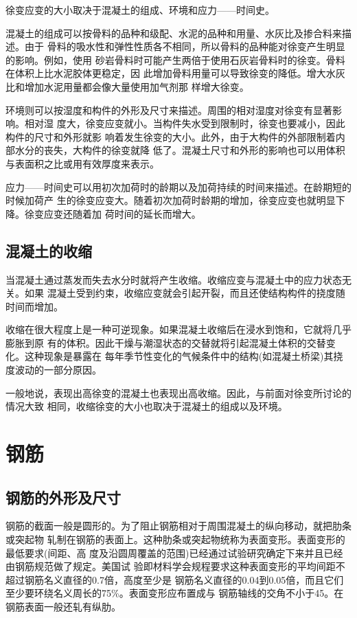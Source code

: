 \documentclass[12pt,a4paper]{book}
\begin{document}
徐变应变的大小取决于混凝土的组成、环境和应力——时间史。

混凝土的组成可以按骨料的品种和级配、水泥的品种和用量、水灰比及掺合料来描述。由于
骨料的吸水性和弹性性质各不相同，所以骨料的品种能对徐变产生明显的影响。例如，使用
砂岩骨料时可能产生两倍于使用石灰岩骨料时的徐变。骨料在体积上比水泥胶体更稳定，因
此增加骨料用量可以导致徐变的降低。增大水灰比和增加水泥用量都会像大量使用加气剂那
样增大徐变。

环境则可以按湿度和构件的外形及尺寸来描述。周围的相对湿度对徐变有显著影响。相对湿
度大，徐变应变就小。当构件失水受到限制时，徐变也要减小，因此构件的尺寸和外形就影
响着发生徐变的大小。此外，由于大构件的外部限制着内部水分的丧失，大构件的徐变就降
低了。混凝土尺寸和外形的影响也可以用体积与表面积之比或用有效厚度来表示。

应力——时间史可以用初次加荷时的龄期以及加荷持续的时间来描述。在龄期短的时候加荷产
生的徐变应变大。随着初次加荷时龄期的增加，徐变应变也就明显下降。徐变应变还随着加
荷时间的延长而增大。

\subsection{混凝土的收缩}

当混凝土通过蒸发而失去水分时就将产生收缩。收缩应变与混凝土中的应力状态无关。如果
混凝土受到约束，收缩应变就会引起开裂，而且还使结构构件的挠度随时间而增加。

收缩在很大程度上是一种可逆现象。如果混凝土收缩后在浸水到饱和，它就将几乎膨胀到原
有的体积。因此干燥与潮湿状态的交替就将引起混凝土体积的交替变化。这种现象是暴露在
每年季节性变化的气候条件中的结构(如混凝土桥梁)其挠度波动的一部分原因。

一般地说，表现出高徐变的混凝土也表现出高收缩。因此，与前面对徐变所讨论的情况大致
相同，收缩徐变的大小也取决于混凝土的组成以及环境。

\section{钢筋}

\subsection{钢筋的外形及尺寸}

钢筋的截面一般是圆形的。为了阻止钢筋相对于周围混凝土的纵向移动，就把肋条或突起物
轧制在钢筋的表面上。这种肋条或突起物统称为表面变形。表面变形的最低要求(间距、高
度及沿圆周覆盖的范围)已经通过试验研究确定下来并且已经由钢筋规范做了规定。美国试
验即材料学会规程要求这种表面变形的平均间距不超过钢筋名义直径的0.7倍，高度至少是
钢筋名义直径的0.04到0.05倍，而且它们至少要环绕名义周长的75\%。表面变形应布置成与
钢筋轴线的交角不小于45。在钢筋表面一般还轧有纵肋。
\end{document}
